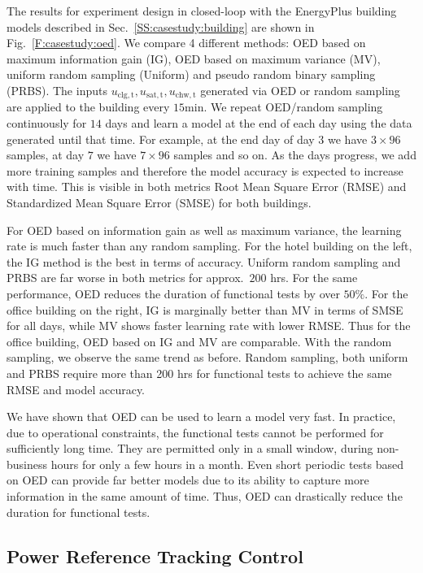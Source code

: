 The results for experiment design in closed-loop with the EnergyPlus building models described in Sec.~\ref{SS:casestudy:building} are shown in Fig.~\ref{F:casestudy:oed}.
We compare 4 different methods: OED based on maximum information gain (IG), OED based on maximum variance (MV), uniform random sampling (Uniform) and pseudo random binary sampling (PRBS).
The inputs \(u_{\mathrm{clg,t}},u_{\mathrm{sat,t}},u_{\mathrm{chw,t}}\) generated via OED or random sampling are applied to the building every \(15 \mathrm{min}\).
We repeat OED/random sampling continuously for \(14\) days and learn a model at the end of each day using the data generated until that time. 
For example, at the end day of day \(3\) we have \(3\times96\) samples, at day \(7\) we have \(7\times96\) samples and so on. 
As the days progress, we add more training samples and therefore the model accuracy is expected to increase with time. 
This is visible in both metrics Root Mean Square Error (RMSE) and Standardized Mean Square Error (SMSE) for both buildings.

For OED based on information gain as well as maximum variance, the learning rate is much faster than any random sampling.
For the hotel building on the left, the IG method is the best in terms of accuracy. %
Uniform random sampling and PRBS are far worse in both metrics for approx.~\(200\) hrs. For the same performance, OED reduces the duration of functional tests by over \(50\%\).
For the office building on the right, IG is marginally better than MV in terms of SMSE for all days, while MV shows faster learning rate with lower RMSE. 
Thus for the office building, OED based on IG and MV are comparable. 
With the random sampling, we observe the same trend as before.
Random sampling, both uniform and PRBS require more than 200 hrs for functional tests to achieve the same RMSE and model accuracy.

We have shown that OED can be used to learn a model very fast.
In practice, due to operational constraints, the functional tests cannot be performed for sufficiently long time. 
They are permitted only in a small window, during non-business hours for only a few hours in a month. 
Even short periodic tests based on OED can provide far better models due to its ability to capture more information in the same amount of time.
Thus, OED can drastically reduce the duration for functional tests.

\subsection{Power Reference Tracking Control}
\label{SS:power_tracking}

